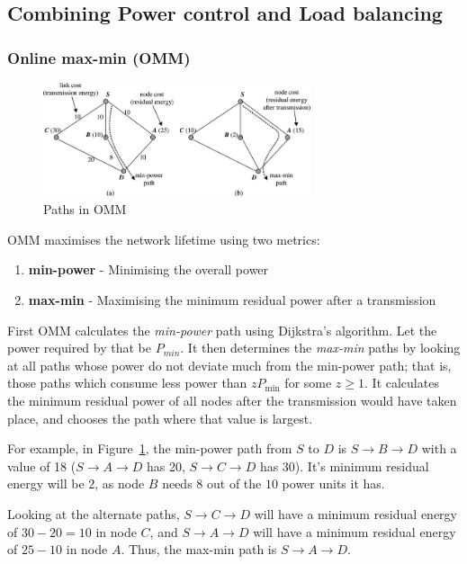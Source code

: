 
\subsection{Combining Power control and Load balancing}

\subsubsection{Online max-min (OMM)}
\begin{figure}
\centering
\includegraphics[width=0.7\textwidth]{images/omm}
\caption{Paths in OMM\cite{alotaibi2012survey}}
\label{ommex}
\end{figure}
\label{omm}
OMM \cite{li2001online} maximises the network lifetime using two metrics:
\begin{enumerate}
  \item \textbf{min-power} - Minimising the overall power
  \item \textbf{max-min} - Maximising the minimum residual power after a transmission
\end{enumerate}

First OMM calculates the \textit{min-power} path using Dijkstra’s algorithm. Let
the power required by that be $P_{min}$.
It then determines the \textit{max-min} paths by looking at all paths whose
power do not deviate much from the min-power path; that is, those paths which consume less
power than $zP_{\min}$ for some $z \ge 1$. It calculates the minimum residual power of all nodes
after the transmission would have taken place, and chooses the path where
that value is largest.

For example, in Figure~\ref{ommex}, the min-power path from
$S$ to $D$ is $S \to B \to D$ with a value of 18 ($S \to A \to D$ has 20,
$S \to C \to D$ has 30).
It's minimum residual energy will be $2$, as node $B$ needs
$8$ out of the $10$ power units it has.

Looking at the alternate paths, $S \to C \to D$ will have a
minimum residual energy of $30-20=10$ in node $C$, and $S \to A \to D$ will
have a minimum residual energy of $25-10$ in node $A$.
Thus, the max-min path is $S \to A \to D$.

